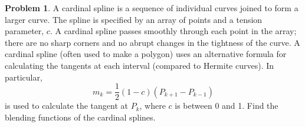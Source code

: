 \documentclass[10pt]{article}
\theoremstyle{plain}
\theoremstyle{definition}
\newtheorem{prob}{Problem}
\numberwithin{equation}{section}
\begin{document}
\begin{prob}
    A cardinal spline is a sequence of individual curves joined to form a
    larger curve. The spline is specified by an array of points and a tension
    parameter, $c$. A cardinal spline passes smoothly through each point in the
    array; there are no sharp corners and no abrupt changes in the tightness
    of the curve. A cardinal spline (often used to make a polygon) uses an
    alternative formula for calculating the tangents at each interval
    (compared to Hermite curves). In particular, 
    \[
            m_k = \frac{1}{2}(1-c)\left(P_{k+1} - P_{k-1}\right)
        \]
    is used to calculate the tangent at $P_k$, where $c$ is between 0 and 1.
    Find the blending functions of the cardinal splines.
\end{prob}
\end{document}
